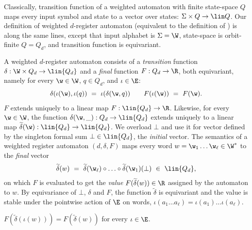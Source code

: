 Classically, transition function of a weighted automaton with finite state-space $Q$
maps every input symbol and state to a vector over states:
$\Sigma\times Q\to \lin Q$.
%
Our definition of weighted $d$-register automaton 
(equivalent to the definition of \cite{BKM21}) is along the same lines,
except that input alphabet is $\Sigma=\W$,
state-space is orbit-finite $Q = Q_d$, 
and transition function is equivariant.

A weighted $d$-register automaton consists of a \emph{transition} function
$\delta : \W\times Q_d\to\lin {Q_d}$ and a \emph{final} function
$F : Q_d\to\R$, both equivariant, namely for every $\w\in\W$, $q\in Q_d$,  
and $\iota\in\E$:
\[
\delta(\iota(\w), \iota(q)) \ = \ \iota(\delta(\w, q))
\qquad
F(\iota(\w)) \ = \ F(\w).
\]
$F$ extends uniquely to a linear map $F : \lin {Q_d}\to \R$.
Likewise, for every $\w\in\W$, the function $\delta(\w, \_) : Q_d\to\lin {Q_d}$ extends 
uniquely to a linear map $\widetilde\delta(\w) : \lin {Q_d}\to \lin {Q_d}$.
We overload $\bot$ and use it for vector defined by 
the singleton formal sum $\bot\in\lin{Q_d}$, the \emph{initial} vector.
The semantics of a weighted register automaton 
$(d, \delta, F)$
maps every word $w = \w_1 \ldots \w_\ell\in\W^*$ to the \emph{final} vector
\[
\widetilde\delta(w) \ = \ \widetilde\delta(\w_\ell) \circ \ldots \circ \widetilde\delta(\w_1)(\bot) \ \in \ \lin {Q_d},
\]
on which $F$ is evaluated to get the \emph{value} $F(\widetilde\delta(w))\in\R$ 
assigned by the automaton to $w$.
By equivariance of $\bot$, $\delta$ and $F$, the function
$\widetilde\delta$ is equivariant and
the value is stable under the 
pointwise action of $\E$ on words,
$\iota(a_1 \ldots a_\ell) = \iota(a_1)\ldots \iota(a_\ell)$.
%
\begin{lemma} \label{lem:value}
$F(\widetilde\delta(\iota(w))) = F(\widetilde\delta(w))$ for every $\iota \in \E$.
\end{lemma}

